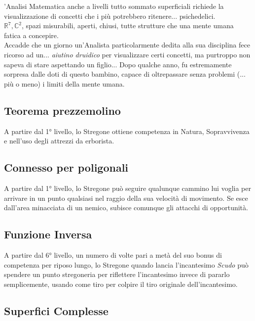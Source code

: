 'Analisi Matematica anche a livelli tutto sommato superficiali richiede la visualizzazione di concetti che i più potrebbero ritenere... psichedelici. \\ \begin{math} \mathbb{R}^7, \mathbb{C}^2\end{math}, spazi misurabili, aperti, chiusi, tutte strutture che una mente umana fatica a concepire. \\ Accadde che un giorno un'Analista particolarmente dedita alla sua disciplina fece ricorso ad un... \textit{aiutino druidico} per visualizzare certi concetti, ma purtroppo non sapeva di stare aspettando un figlio... Dopo qualche anno, fu estremamente sorpresa dalle doti di questo bambino, capace di oltrepassare senza problemi (... più o meno) i limiti della mente umana.

\subsection{Teorema prezzemolino}

A partire dal 1° livello, lo Stregone ottiene competenza in Natura, Sopravvivenza e nell'uso degli attrezzi da erborista.

\subsection{Connesso per poligonali}

A partire dal 1° livello, lo Stregone può seguire qualunque cammino lui voglia per arrivare in un punto qualsiasi nel raggio della sua velocità di movimento. Se esce dall'area minacciata di un nemico, subisce comunque gli attacchi di opportunità.

\subsection{Funzione Inversa}

A partire dal 6° livello, un numero di volte pari a metà del suo bonus di competenza per riposo lungo, lo Stregone quando lancia l'incantesimo \textit{Scudo} può spendere un punto stregoneria per riflettere l'incantesimo invece di pararlo semplicemente, usando come tiro per colpire il tiro originale dell'incantesimo.

\subsection{Superfici Complesse}

